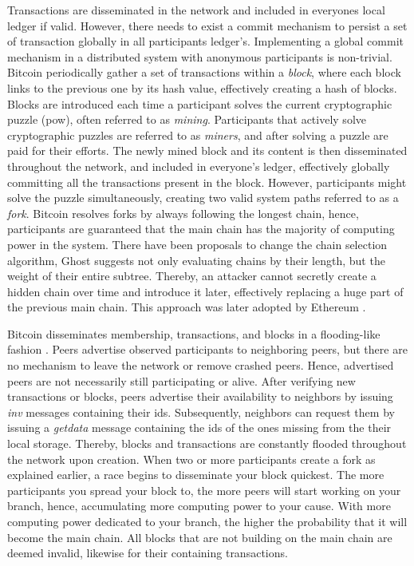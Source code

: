 \documentclass[USenglish]{uit-thesis}
\begin{document}
Transactions are disseminated in the network and included in everyones local ledger if valid.
However, there needs to exist a commit mechanism to persist a set of transaction globally in all participants ledger's.
Implementing a global commit mechanism in a distributed system with anonymous participants is non-trivial. 
Bitcoin periodically gather a set of transactions within a \textit{block}, where each block links to the previous one by its hash value, effectively creating a hash of blocks.
Blocks are introduced each time a participant solves the current cryptographic puzzle (\gls{pow}), often referred to as \textit{mining}.
Participants that actively solve cryptographic puzzles are referred to as \textit{miners}, and after solving a puzzle are paid for their efforts.
The newly mined block and its content is then disseminated throughout the network, and included in everyone's ledger, effectively globally committing all the transactions present in the block.
However, participants might solve the puzzle simultaneously, creating two valid system paths referred to as a \textit{fork}.
Bitcoin resolves forks by always following the longest chain, hence, participants are guaranteed that the main chain has the majority of computing power in the system.
There have been proposals to change the chain selection algorithm, Ghost \cite{ghost} suggests not only evaluating chains by their length, but the weight of their entire subtree. 
Thereby, an attacker cannot secretly create a hidden chain over time and introduce it later, effectively replacing a huge part of the previous main chain.
This approach was later adopted by Ethereum \cite{ether}.


Bitcoin disseminates membership, transactions, and blocks in a flooding-like fashion \cite{propa}.
Peers advertise observed participants to neighboring peers, but there are no mechanism to leave the network or remove crashed peers.
Hence, advertised peers are not necessarily still participating or alive.
After verifying new transactions or blocks, peers advertise their availability to neighbors by issuing \textit{inv} messages containing their ids.
Subsequently, neighbors can request them by issuing a \textit{getdata} message containing the ids of the ones missing from the their local storage. 
Thereby, blocks and transactions are constantly flooded throughout the network upon creation.
When two or more participants create a fork as explained earlier, a race begins to disseminate your block quickest.
The more participants you spread your block to, the more peers will start working on your branch, hence, accumulating more computing power to your cause.
With more computing power dedicated to your branch, the higher the probability that it will become the main chain.
All blocks that are not building on the main chain are deemed invalid, likewise for their containing transactions.
\end{document}
